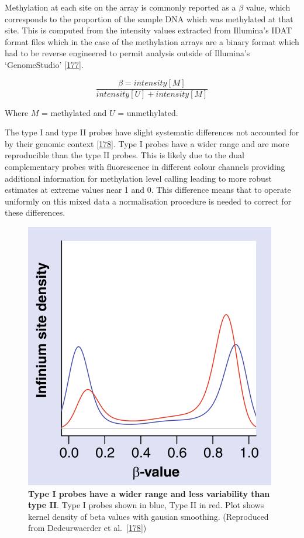 \documentclass[
]{book}
\begin{document}
Methylation at each site on the array is commonly reported as a \(\beta\) value, which corresponds to the proportion of the sample DNA which was methylated at that site.
This is computed from the intensity values extracted from Illumina's IDAT format files which in the case of the methylation arrays are a binary format which had to be reverse engineered to permit analysis outside of Illumina's `GenomeStudio' {[}\protect\hyperlink{ref-Smith2013}{177}{]}.

\[\frac{\beta=intensity[M]}{intensity[U] + intensity[M]}\]

Where \(M\) = methylated and \(U\) = unmethylated.

The type I and type II probes have slight systematic differences not accounted for by their genomic context {[}\protect\hyperlink{ref-Dedeurwaerder2011}{178}{]}.
Type I probes have a wider range and are more reproducible than the type II probes.
This is likely due to the dual complementary probes with fluorescence in different colour channels providing additional information for methylation level calling leading to more robust estimates at extreme values near 1 and 0.
This difference means that to operate uniformly on this mixed data a normalisation procedure is needed to correct for these differences.

\begin{figure}

{\centering \includegraphics[width=0.5\linewidth]{figs/Dedeurwaerder2011fig1bL} 

}

\caption{\textbf{Type I probes have a wider range and less variability than type II}. Type I probes shown in blue, Type II in red. Plot shows kernel density of beta values with gausian smoothing. (Reproduced from Dedeurwaerder et al.~{[}\protect\hyperlink{ref-Dedeurwaerder2011}{178}{]})}\label{fig:Dedeurwaerder2011fig1bL}
\end{figure}
\end{document}
